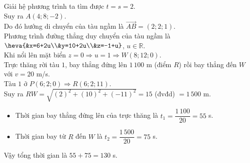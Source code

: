\begin{bt}
{		Giải hệ phương trình ta tìm được $t=s=2$.\\ 
		Suy ra  $A(4;8;-2)$.\\
		Do đó hướng di chuyển  của tàu ngầm là $\overrightarrow{A B}=(2; 2; 1)$.\\
		Phương trình  đường thẳng duy chuyển của tàu ngầm là
		 $\heva{&x=6+2u\\&y=10+2u\\&z=-1+u}$, $u\in \mathbb{R}$.\\
		Khi nổi lên  mặt biển $z=0\Rightarrow u=1 \Rightarrow W(8;12;0)$.\\
		Trực thăng rời tàu  $1$, bay thẳng đứng lên $1\,100$ m (điểm $R$) rồi bay thẳng đến $W$ với $v=20$ m/s.\\
		Tàu $1$  ở $P(6;2;0) \Rightarrow R(6;2;11)$.\\
		 Suy ra $RW=\sqrt{(2)^2+(10)^2+(-11)^2}=15$ (đvđd) $=1\,500$ m.\\
		\begin{itemize}
			\item Thời  gian bay thẳng đứng lên của trực thăng là $t_{1}=\dfrac{1\,100}{20}=55$ s.
			\item Thời gian bay từ $R$ đến  $W$ là $t_{2}=\dfrac{1\,500}{20}=75$ s.
		\end{itemize}
		Vậy tổng thời gian là $55+75=130$  s.
	} 
\end{bt}


